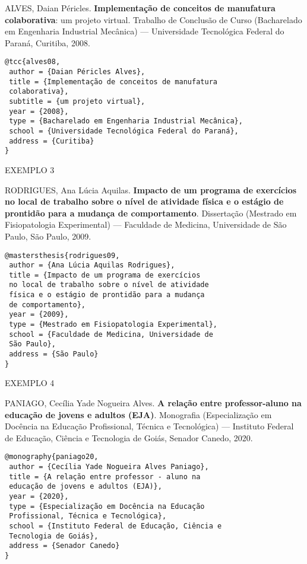 ALVES, Daian Péricles. \textbf{Implementação de conceitos de manufatura colaborativa}: um projeto virtual. Trabalho de Conclusão de Curso (Bacharelado em Engenharia Industrial Mecânica) — Universidade Tecnológica Federal do Paraná, Curitiba, 2008.

\begin{verbatim}
@tcc{alves08,
 author = {Daian Péricles Alves},
 title = {Implementação de conceitos de manufatura 
 colaborativa},
 subtitle = {um projeto virtual},
 year = {2008},
 type = {Bacharelado em Engenharia Industrial Mecânica},
 school = {Universidade Tecnológica Federal do Paraná},
 address = {Curitiba}
}
\end{verbatim}

EXEMPLO 3 

RODRIGUES, Ana Lúcia Aquilas. \textbf{Impacto de um programa de exercícios no local de trabalho sobre o nível de atividade física e o estágio de prontidão para a mudança de comportamento}. Dissertação (Mestrado em Fisiopatologia Experimental) — Faculdade de Medicina, Universidade de São Paulo, São Paulo, 2009.

\begin{verbatim}
@mastersthesis{rodrigues09,
 author = {Ana Lúcia Aquilas Rodrigues},
 title = {Impacto de um programa de exercícios 
 no local de trabalho sobre o nível de atividade 
 física e o estágio de prontidão para a mudança 
 de comportamento},
 year = {2009},
 type = {Mestrado em Fisiopatologia Experimental},
 school = {Faculdade de Medicina, Universidade de 
 São Paulo},
 address = {São Paulo}
}
\end{verbatim}

EXEMPLO 4 

PANIAGO, Cecília Yade Nogueira Alves. \textbf{A relação entre professor-aluno na educação de jovens e adultos (EJA)}. Monografia (Especialização em Docência na Educação Profissional, Técnica e Tecnológica) — Instituto Federal de Educação, Ciência e Tecnologia de Goiás, Senador Canedo, 2020.

\begin{verbatim}
@monography{paniago20,
 author = {Cecília Yade Nogueira Alves Paniago},
 title = {A relação entre professor - aluno na 
 educação de jovens e adultos (EJA)},
 year = {2020},
 type = {Especialização em Docência na Educação 
 Profissional, Técnica e Tecnológica},
 school = {Instituto Federal de Educação, Ciência e 
 Tecnologia de Goiás},
 address = {Senador Canedo}
}
\end{verbatim}

